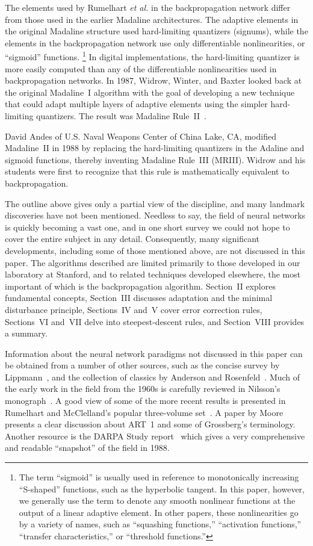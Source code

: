 \documentclass[10pt,twocolumn]{article}
\begin{document}
The elements used by Rumelhart \textit{et al.} in the backpropagation network
differ from those used in the earlier Madaline architectures. The adaptive
elements in the original Madaline structure used hard-limiting quantizers
(signums), while the elements in the backpropagation network use only
differentiable nonlinearities, or ``sigmoid'' functions.%
\footnote{The term ``sigmoid'' is usually used in reference to monotonically
increasing ``S-shaped'' functions, such as the hyperbolic tangent. In this
paper, however, we generally use the term to denote any smooth nonlinear
functions at the output of a linear adaptive element. In other papers, these
nonlinearities go by a variety of names, such as ``squashing functions,''
``activation functions,'' ``transfer characteristics,'' or ``threshold
functions.''}
In digital implementations, the hard-limiting quantizer is more easily computed
than any of the differentiable nonlinearities used in backpropagation networks.
In 1987, Widrow, Winter, and Baxter looked back at the original Madaline~I
algorithm with the goal of developing a new technique that could adapt multiple
layers of adaptive elements using the simpler hard-limiting quantizers. The
result was Madaline Rule~II~\cite{wwb}.

David Andes of U.S. Naval Weapons Center of China Lake, CA, modified
Madaline~II in 1988 by replacing the hard-limiting quantizers in the Adaline
and sigmoid functions, thereby inventing Madaline Rule~III (MRIII). Widrow and
his students were first to recognize that this rule is mathematically
equivalent to backpropagation.

The outline above gives only a partial view of the discipline, and many
landmark discoveries have not been mentioned. Needless to say, the field of
neural networks is quickly becoming a vast one, and in one short survey we could
not hope to cover the entire subject in any detail. Consequently, many
significant developments, including some of those mentioned above, are not
discussed in this paper. The algorithms described are limited primarily to
those developed in our laboratory at Stanford, and to related techniques
developed elsewhere, the most important of which is the backpropagation
algorithm. Section~II explores fundamental concepts, Section~III discusses
adaptation and the minimal disturbance principle, Sections~IV and~V cover error
correction rules, Sections~VI and~VII delve into steepest-descent rules, and
Section~VIII provides a summary.

Information about the neural network paradigms not discussed in this paper can
be obtained from a number of other sources, such as the concise survey by
Lippmann~\cite{lippmann}, and the collection of classics by Anderson and
Rosenfeld~\cite{androse}. Much of the early work in the field from the 1960s is
carefully reviewed in Nilsson's monograph~\cite{nilsson}. A good view of some of
the more recent results is presented in Rumelhart and McClelland's popular
three-volume set~\cite{pdp}. A paper by Moore~\cite{moore} presents a clear
discussion about ART~1 and some of Grossberg's terminology. Another resource is
the DARPA Study report~\cite{darpa} which gives a very comprehensive and
readable ``snapshot'' of the field in 1988.
\end{document}
